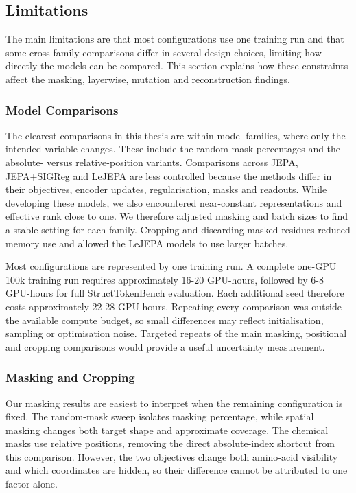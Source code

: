 \subsection{Limitations}

The main limitations are that most configurations use one training run and that some cross-family comparisons differ in several design choices, limiting how directly the models can be compared. This section explains how these constraints affect the masking, layerwise, mutation and reconstruction findings.

\subsubsection{Model Comparisons}

The clearest comparisons in this thesis are within model families, where only the intended variable changes. These include the random-mask percentages and the absolute- versus relative-position variants. Comparisons across JEPA, JEPA+SIGReg and LeJEPA are less controlled because the methods differ in their objectives, encoder updates, regularisation, masks and readouts. While developing these models, we also encountered near-constant representations and effective rank close to one. We therefore adjusted masking and batch sizes to find a stable setting for each family. Cropping and discarding masked residues reduced memory use and allowed the LeJEPA models to use larger batches. 

Most configurations are represented by one training run. A complete one-GPU 100k training run requires approximately 16-20 GPU-hours, followed by 6-8 GPU-hours for full StructTokenBench evaluation. Each additional seed therefore costs approximately 22-28 GPU-hours. Repeating every comparison was outside the available compute budget, so small differences may reflect initialisation, sampling or optimisation noise. Targeted repeats of the main masking, positional and cropping comparisons would provide a useful uncertainty measurement.

\subsubsection{Masking and Cropping}

Our masking results are easiest to interpret when the remaining configuration is fixed. The random-mask sweep isolates masking percentage, while spatial masking changes both target shape and approximate coverage. The chemical masks use relative positions, removing the direct absolute-index shortcut from this comparison. However, the two objectives change both amino-acid visibility and which coordinates are hidden, so their difference cannot be attributed to one factor alone.

